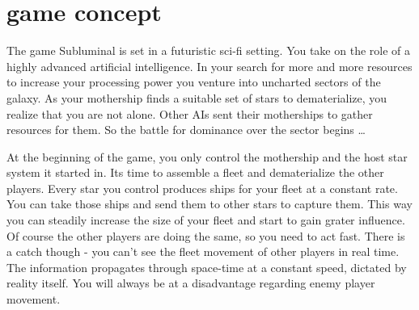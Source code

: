 \chapter{game concept}
The game Subluminal is set in a futuristic sci-fi setting. You take on the role of a highly advanced artificial intelligence. In your search for more and more resources to increase your processing power you venture into uncharted sectors of the galaxy. As your mothership finds a suitable set of stars to dematerialize, you realize that you are not alone. Other AIs sent their motherships to gather resources for them. So the battle for dominance over the sector begins \ldots

At the beginning of the game, you only control the mothership and the host star system it started in. Its time to assemble a fleet and dematerialize the other players. Every star you control produces ships for your fleet at a constant rate. You can take those ships and send them to other stars to capture them. This way you can steadily increase the size of your fleet and start to gain grater influence. Of course the other players are doing the same, so you need to act fast. There is a catch though - you can't see the fleet movement of other players in real time. The information propagates through space-time at a constant speed, dictated by reality itself. You will always be at a disadvantage regarding enemy player movement. 